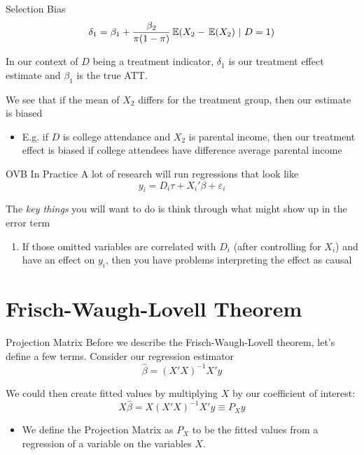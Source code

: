 \documentclass[aspectratio=169,t,11pt,table]{beamer}
\begin{document}
\begin{frame}{Selection Bias}
  \vspace*{-\bigskipamount}
  $$
    \delta_1 = \beta_1 + \frac{\beta_2}{\pi (1 - \pi)} \expec{X_2 - \expec{X_2}}{D = 1}
  $$

  \bigskip
  In our context of $D$ being a treatment indicator, $\delta_1$ is our treatment effect estimate and $\beta_1$ is the true ATT.

  \pause
  \bigskip
  We see that if the mean of $X_2$ differs for the treatment group, then our estimate is biased
  \begin{itemize}
    \item E.g. if $D$ is college attendance and $X_2$ is parental income, then our treatment effect is biased if college attendees have difference average parental income
  \end{itemize}
\end{frame}


\begin{frame}{OVB In Practice}
  A lot of research will run regressions that look like 
  $$
    y_i = D_i \tau + X_i' \beta + \varepsilon_i
  $$

  \bigskip
  The \emph{key things} you will want to do is think through what might show up in the error term
  \begin{enumerate}
    \item If those omitted variables are correlated with $D_i$ (after controlling for $X_i$) and have an effect on $y_i$, then you have problems interpreting the effect as causal
  \end{enumerate}
\end{frame}


\section{Frisch-Waugh-Lovell Theorem}

\begin{frame}{Projection Matrix}
  Before we describe the Frisch-Waugh-Lovell theorem, let's define a few terms. Consider our regression estimator
  $$
    \hat{\beta} = \left( X'X \right)^{-1} X' y
  $$
  
  \bigskip
  We could then create fitted values by multiplying $X$ by our coefficient of interest: 
  $$
    X \hat{\beta} = X \left( X'X \right)^{-1} X' y \equiv P_X y
  $$
  \begin{itemize}
    \item We define the \alert{Projection Matrix} as $P_X$ to be the fitted values from a regression of a variable on the variables $X$.
  \end{itemize}
\end{frame}
\end{document}
